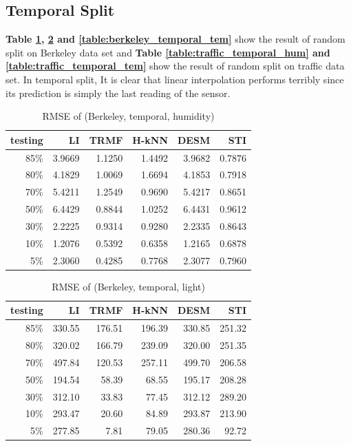 \subsection{Temporal Split}
\textbf{Table \ref{table:berkeley_temporal_hum}, \ref{table:berkeley_temporal_light} and \ref{table:berkeley_temporal_tem}} show the result of random split on Berkeley data set and \textbf{Table \ref{table:traffic_temporal_hum} and \ref{table:traffic_temporal_tem}} show the result of random split on traffic data set. In temporal split,  It is clear that linear interpolation performs terribly since its prediction is simply the last reading of the sensor.

\begin{table}[htbp]
\centering
\caption{RMSE of (Berkeley, temporal, humidity)}
\label{table:berkeley_temporal_hum}
\begin{tabular}{ r | r r r r r}
	testing	&LI	&TRMF	&H-kNN	&DESM	&STI\\ \hline
	85\%	&3.9669	&1.1250	&1.4492	&3.9682	&0.7876\\ 
	80\%	&4.1829	&1.0069	&1.6694	&4.1853	&0.7918\\
	70\%	&5.4211	&1.2549	&0.9690	&5.4217	&0.8651\\
	50\%	&6.4429	&0.8844	&1.0252	&6.4431	&0.9612\\
	30\%	&2.2225	&0.9314	&0.9280	&2.2335	&0.8643\\
	10\%	&1.2076	&0.5392	&0.6358	&1.2165	&0.6878\\
	 5\%	&2.3060	&0.4285	&0.7768	&2.3077	&0.7960\\
\end{tabular}
\end{table}

\begin{table}[htbp]
\centering
\caption{RMSE of (Berkeley, temporal, light)}
\label{table:berkeley_temporal_light}
\begin{tabular}{ r | r r r r r}
	testing	&LI	&TRMF	&H-kNN	&DESM	&STI\\ \hline
	85\%	&330.55	&176.51	&196.39	&330.85	&251.32\\ 
	80\%	&320.02	&166.79	&239.09	&320.00	&251.35\\
	70\%	&497.84	&120.53	&257.11	&499.70	&206.58\\
	50\%	&194.54	&58.39	&68.55	&195.17	&208.28\\
	30\%	&312.10	&33.83	&77.45	&312.12	&289.20\\
	10\%	&293.47	&20.60	&84.89	&293.87	&213.90\\
	 5\%	&277.85	&7.81	&79.05	&280.36	& 92.72\\
\end{tabular}
\end{table}


